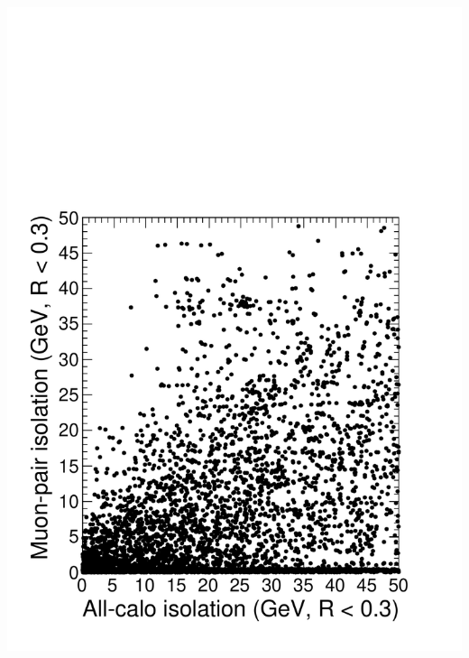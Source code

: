 \documentclass[compress]{beamer}
\begin{document}
\begin{frame}
\begin{columns}
\includegraphics[width=\linewidth]{bubbleiso_vs_caloiso_background.pdf}
\end{columns}
\end{frame}
\end{document}
